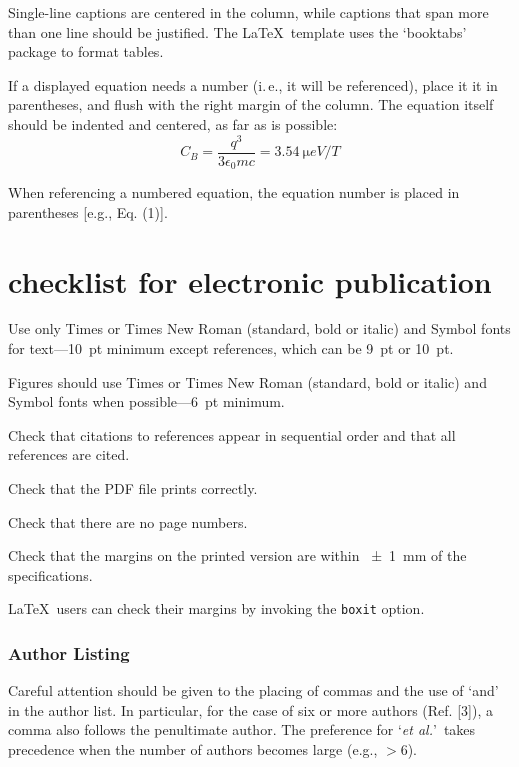 \documentclass[letterpaper,  %
              ]{jacow-2_3}   %
\begin{document}
 Single-line captions are centered in the column, while captions
that span more than one line should be justified.
The \LaTeX\ template uses the ‘booktabs’ package to
format tables.

If a displayed equation needs a number (i.\,e., it will be
referenced), place it it in parentheses, and flush with the
right margin of the column. The equation itself should be
indented and centered, as far as is possible:
\begin{equation}\label{eq:units}
    C_B=\frac{q^3}{3\epsilon_{0} mc}=\SI{3.54}{\micro eV/T}
\end{equation}

When referencing a numbered equation, the equation number is placed
in parentheses [e.g., Eq. (1)].

\section{checklist for electronic publication}

\begin{Itemize}
	\item  Use only Times or Times New Roman (standard, bold or italic) and Symbol
	fonts for text---\SI{10}{pt} minimum except references, which can be \SI{9}{pt} or \SI{10}{pt}.
	\item  Figures should use Times or Times New Roman (standard, bold or italic) and
	Symbol fonts when possible---\SI{6}{pt} minimum.
	\item  Check that citations to references appear in sequential order and
	that all references are cited.
	\item  Check that the PDF file prints correctly.
	\item  Check that there are no page numbers.
	\item  Check that the margins on the printed version are within \SI{\pm1}{mm}
	of the specifications.
	\item  \LaTeX\ users can check their margins by invoking the
	\texttt{boxit} option.
\end{Itemize}

\subsubsection{Author Listing} Careful attention should be given to the
placing of commas and the use of ‘and’ in the author list.
In particular, for the case of six or more authors
(Ref. [3]), a comma also follows the penultimate author.
The preference for ‘\emph{et al.}’\ takes precedence when the number
of authors becomes large (e.g., $>$6).
\end{document}
